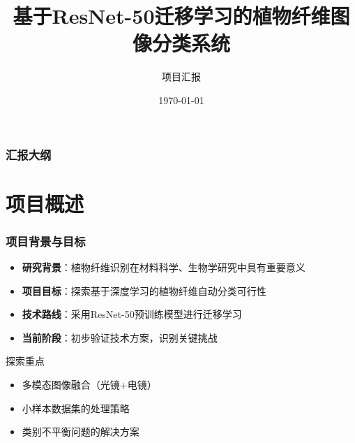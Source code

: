 \documentclass[10pt]{beamer}
\title{基于ResNet-50迁移学习的植物纤维图像分类系统}
\author{项目汇报}
\institute{植物纤维识别项目组}
\date{\today}
\begin{document}
\frame{\titlepage}

\begin{frame}
\frametitle{汇报大纲}
\tableofcontents
\end{frame}

\section{项目概述}

\begin{frame}
\frametitle{项目背景与目标}
\begin{itemize}
    \item \textbf{研究背景}：植物纤维识别在材料科学、生物学研究中具有重要意义
    \item \textbf{项目目标}：探索基于深度学习的植物纤维自动分类可行性
    \item \textbf{技术路线}：采用ResNet-50预训练模型进行迁移学习
    \item \textbf{当前阶段}：初步验证技术方案，识别关键挑战
\end{itemize}

\vspace{0.3cm}
\begin{block}{探索重点}
\begin{itemize}
    \item 多模态图像融合（光镜+电镜）
    \item 小样本数据集的处理策略
    \item 类别不平衡问题的解决方案
\end{itemize}
\end{block}
\end{frame}
\end{document}
